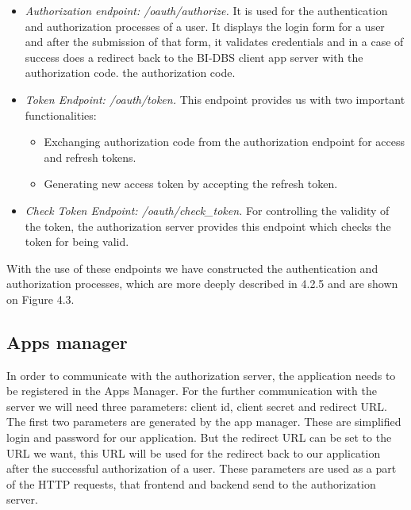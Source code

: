 \begin{itemize}
    \item \emph{Authorization endpoint: /oauth/authorize.} It is used for the authentication and authorization processes of a user. It displays the login form for a user and after the submission of that form, it validates credentials and in a case of success does a redirect back to the BI-DBS client app server with the authorization code.   
    the authorization code.
    \item \emph{Token Endpoint: /oauth/token.} This endpoint provides us with two important functionalities:
        \begin{itemize}
            \item Exchanging authorization code from the authorization endpoint for access and refresh tokens.
            \item Generating new access token by accepting the refresh token.
        \end{itemize}
   \item \emph{Check Token Endpoint: /oauth/check\_token.} For controlling the validity of the token, the authorization server provides this endpoint which checks the token for being valid.
\end{itemize}

\noindent With the use of these endpoints we have constructed the authentication and authorization processes, which are more deeply described in 4.2.5 and are shown on Figure 4.3.


\subsection{Apps manager} In order to communicate with the authorization server, the application needs to be registered in the Apps Manager. For the further communication with the server we will need three parameters: client id, client secret and redirect URL. The first two parameters are generated by the app manager. These are simplified login and password for our application. But the redirect URL can be set to the URL we want, this URL will be used for the redirect back to our application after the successful authorization of a user. These parameters are used as a part of the HTTP requests, that frontend and backend send to the authorization server.

